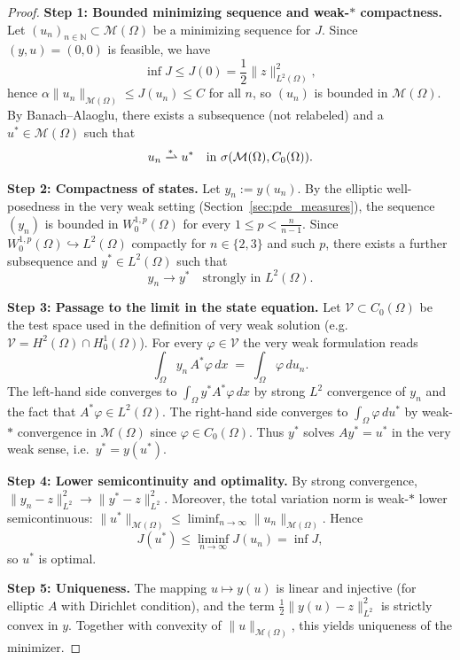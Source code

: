 \documentclass[11pt,a4paper]{article}
\begin{document}
\begin{proof}
\textbf{Step 1: Bounded minimizing sequence and weak-$*$ compactness.}
Let $(u_n)_{n\in\mathbb{N}}\subset\mathcal{M}(\Omega)$ be a minimizing sequence for $J$.
Since $(y,u)=(0,0)$ is feasible, we have
\[
\inf J \le J(0)=\frac12\|z\|_{L^2(\Omega)}^2,
\]
hence $\alpha\|u_n\|_{\mathcal{M}(\Omega)}\le J(u_n)\le C$ for all $n$, so $(u_n)$ is bounded in $\mathcal{M}(\Omega)$.
By Banach--Alaoglu, there exists a subsequence (not relabeled) and a $u^*\in\mathcal{M}(\Omega)$ such that
\[
u_n \xrightharpoonup{*} u^* \quad \text{in } \sigma(\mathcal{M}(\Omega),C_0(\Omega)).
\]

\textbf{Step 2: Compactness of states.}
Let $y_n:=y(u_n)$.
By the elliptic well-posedness in the very weak setting (Section~\ref{sec:pde_measures}),
the sequence $(y_n)$ is bounded in $W^{1,p}_0(\Omega)$ for every $1\le p<\frac{n}{n-1}$.
Since $W^{1,p}_0(\Omega)\hookrightarrow L^2(\Omega)$ compactly for $n\in\{2,3\}$ and such $p$,
there exists a further subsequence and $y^*\in L^2(\Omega)$ such that
\[
y_n \to y^* \quad \text{strongly in } L^2(\Omega).
\]

\textbf{Step 3: Passage to the limit in the state equation.}
Let $\mathcal{V}\subset C_0(\Omega)$ be the test space used in the definition of very weak solution
(e.g.\ $\mathcal{V}=H^2(\Omega)\cap H^1_0(\Omega)$).
For every $\varphi\in\mathcal{V}$ the very weak formulation reads
\[
\int_\Omega y_n\, A^*\varphi\,dx \;=\; \int_\Omega \varphi\,du_n.
\]
The left-hand side converges to $\int_\Omega y^* A^*\varphi\,dx$ by strong $L^2$ convergence of $y_n$
and the fact that $A^*\varphi\in L^2(\Omega)$.
The right-hand side converges to $\int_\Omega \varphi\,du^*$ by weak-$*$ convergence in $\mathcal{M}(\Omega)$
since $\varphi\in C_0(\Omega)$.
Thus $y^*$ solves $Ay^*=u^*$ in the very weak sense, i.e.\ $y^*=y(u^*)$.

\textbf{Step 4: Lower semicontinuity and optimality.}
By strong convergence, $\|y_n-z\|_{L^2}^2\to\|y^*-z\|_{L^2}^2$.
Moreover, the total variation norm is weak-$*$ lower semicontinuous:
$\|u^*\|_{\mathcal{M}(\Omega)}\le \liminf_{n\to\infty}\|u_n\|_{\mathcal{M}(\Omega)}$.
Hence
\[
J(u^*) \le \liminf_{n\to\infty} J(u_n) = \inf J,
\]
so $u^*$ is optimal.

\textbf{Step 5: Uniqueness.}
The mapping $u\mapsto y(u)$ is linear and injective (for elliptic $A$ with Dirichlet condition),
and the term $\frac12\|y(u)-z\|_{L^2}^2$ is strictly convex in $y$.
Together with convexity of $\|u\|_{\mathcal{M}(\Omega)}$, this yields uniqueness of the minimizer.
\end{proof}
\end{document}
